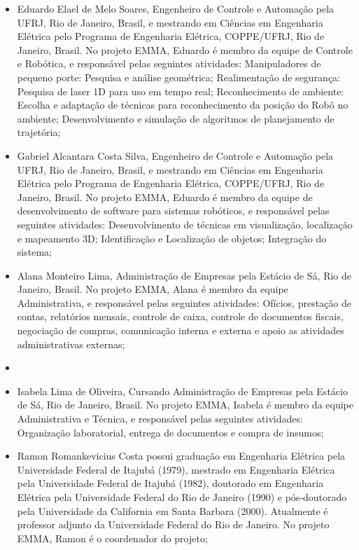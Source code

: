 \begin{itemize}
\item Eduardo Elael de Melo Soares, Engenheiro de Controle e Automação pela UFRJ, Rio
de Janeiro, Brasil, e mestrando em Ciências em Engenharia Elétrica pelo
Programa de Engenharia Elétrica, COPPE/UFRJ, Rio de Janeiro, Brasil. No projeto
EMMA, Eduardo é membro da equipe de Controle e Robótica, e responsável pelas
seguintes atividades: Manipuladores de pequeno porte: Pesquisa e análise
geométrica; Realimentação de segurança: Pesquisa de laser 1D para uso em tempo
real; Reconhecimento de ambiente: Escolha e adaptação de técnicas para
reconhecimento da posição do Robô no ambiente; Desenvolvimento e simulação de
algoritmos de planejamento de trajetória;

\item Gabriel Alcantara Costa Silva, Engenheiro de Controle e Automação pela
UFRJ, Rio de Janeiro, Brasil, e mestrando em Ciências em Engenharia Elétrica pelo
Programa de Engenharia Elétrica, COPPE/UFRJ, Rio de Janeiro, Brasil. No projeto
EMMA, Eduardo é membro da equipe de desenvolvimento de software para sistemas
robóticos, e responsável pelas seguintes atividades: Desenvolvimento de técnicas
em visualização, localização e mapeamento 3D; Identificação e
Localização de objetos; Integração do sistema;

\item Alana Monteiro Lima, Administração de Empresas pela Estácio de Sá, Rio de
Janeiro, Brasil. No projeto EMMA, Alana é membro da equipe Administrativa, e 
responsável pelas seguintes atividades: Ofícios, prestação de contas, 
relatórios mensais, controle de caixa, controle de documentos fiscais, 
negociação de compras, comunicação interna e externa e apoio as atividades 
administrativas externas;
\item 
\item Isabela Lima de Oliveira, Cursando Administração de Empresas pela Estácio
de Sá, Rio de Janeiro, Brasil. No projeto EMMA, Isabela é membro da 
equipe Administrativa e Técnica, e responsável pelas seguintes atividades: 
Organização laboratorial, entrega de documentos e compra de insumos;

\item Ramon Romankevicius Costa possui graduação em Engenharia Elétrica pela
Universidade Federal de Itajubá (1979), mestrado em Engenharia Elétrica pela 
Universidade Federal de Itajubá (1982), doutorado em Engenharia Elétrica pela
Universidade Federal do Rio de Janeiro (1990) e pós-doutorado pela Universidade 
da California em Santa
Barbara (2000). Atualmente é professor adjunto da Universidade Federal do Rio de
Janeiro. No projeto EMMA, Ramon é o coordenador do projeto;

\end{itemize}


